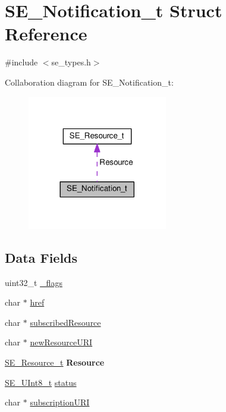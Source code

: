 \hypertarget{structSE__Notification__t}{}\section{S\+E\+\_\+\+Notification\+\_\+t Struct Reference}
\label{structSE__Notification__t}


{\ttfamily \#include $<$se\+\_\+types.\+h$>$}



Collaboration diagram for S\+E\+\_\+\+Notification\+\_\+t\+:\nopagebreak
\begin{figure}[H]
\begin{center}
\leavevmode
\includegraphics[width=173pt]{structSE__Notification__t__coll__graph}
\end{center}
\end{figure}
\subsection*{Data Fields}
\begin{DoxyCompactItemize}
\item 
uint32\+\_\+t \hyperlink{group__Notification_ga9cea77779c1429775de7c3bbf1e8c361}{\+\_\+flags}
\item 
char $\ast$ \hyperlink{group__Notification_ga9d9fbe351ee2dd052e844c3dc0cd8222}{href}
\item 
char $\ast$ \hyperlink{group__Notification_ga80e27fbceef2bc002f54d227f0815df6}{subscribed\+Resource}
\item 
char $\ast$ \hyperlink{group__Notification_ga9dab2eb1085b330946a147430a8a9c3e}{new\+Resource\+U\+RI}
\item 
\hyperlink{structSE__Resource__t}{S\+E\+\_\+\+Resource\+\_\+t} {\bfseries Resource}
\item 
\hyperlink{group__UInt8_gaf7c365a1acfe204e3a67c16ed44572f5}{S\+E\+\_\+\+U\+Int8\+\_\+t} \hyperlink{group__Notification_ga5ed1873d82ef9cabb0b98af44f0a3cc1}{status}
\item 
char $\ast$ \hyperlink{group__Notification_gacd85c02c4ba0556285ab3f8544b31f96}{subscription\+U\+RI}
\end{DoxyCompactItemize}


